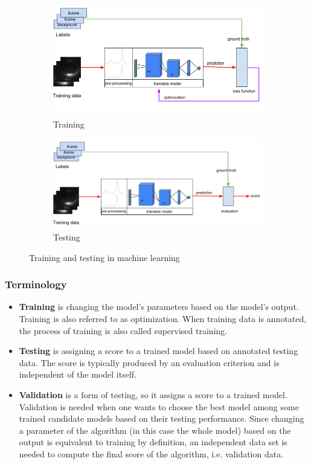 		\begin{figure}
			\centering
			\begin{subfigure}[b]{\textwidth}
				\centering
				\includegraphics[scale=.6]{images/training_intro.png}
				\caption{Training}
			\end{subfigure}
			\vfill
			\begin{subfigure}[b]{\textwidth}
				\centering
				\includegraphics[scale=.6]{images/testing_intro.png}
				\caption{Testing}
			\end{subfigure}
			\caption{Training and testing in machine learning}
			\label{fig:machine_learning_intro}
		\end{figure}				
		
		
		\subsubsection{Terminology}
			\begin{itemize} 
				\item \textbf{Training} is changing the model's parameters based on the model's output. Training is also referred to as optimization. When training data is annotated, the process of training is also called supervised training. 
				\item \textbf{Testing} is assigning a score to a trained model based on annotated testing data. The score is typically produced by an evaluation criterion and is independent of the model itself. 
				\item \textbf{Validation} is a form of testing, so it assigns a score to a trained model. Validation is needed when one wants to choose the best model among some trained candidate models based on their testing performance. Since changing a parameter of the algorithm (in this case the whole model) based on the output is equivalent to training by definition, an independent data set is needed to compute the final score of the algorithm, i.e. validation data. 
			\end{itemize}				
			
